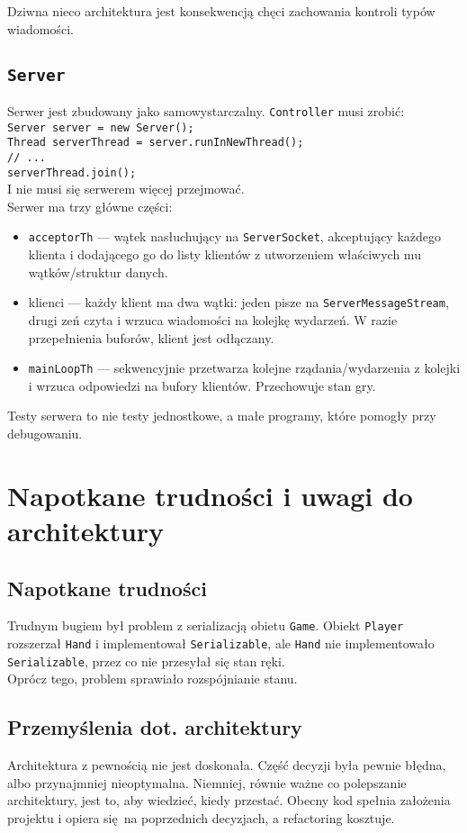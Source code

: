 \documentclass{article}
\newcommand{\ch}[1]{\texttt{#1}}
\begin{document}
Dziwna nieco architektura jest konsekwencją chęci zachowania kontroli typów wiadomości.

\subsection{\ch{Server}}

Serwer jest zbudowany jako samowystarczalny. \ch{Controller} musi zrobić:\\
\ch{Server server = new Server();\\
Thread serverThread = server.runInNewThread();\\
// ...\\
serverThread.join();}\\
I nie musi się serwerem więcej przejmować.\\

Serwer ma trzy główne części:
\begin{itemize}
	\item \ch{acceptorTh} --- wątek nasłuchujący na \ch{ServerSocket}, akceptujący każdego klienta i dodającego go do listy klientów z utworzeniem właściwych mu wątków/struktur danych.
	\item klienci --- każdy klient ma dwa wątki: jeden pisze na \ch{ServerMessageStream}, drugi zeń czyta i wrzuca wiadomości na kolejkę wydarzeń. W razie przepełnienia buforów, klient jest odłączany.
	\item \ch{mainLoopTh} --- sekwencyjnie przetwarza kolejne rządania/wydarzenia z kolejki i wrzuca odpowiedzi na bufory klientów. Przechowuje stan gry.
\end{itemize}

Testy serwera to nie testy jednostkowe, a małe programy, które pomogły przy debugowaniu.

\section{Napotkane trudności i uwagi do architektury}

\subsection{Napotkane trudności}

Trudnym bugiem był problem z serializacją obietu \ch{Game}. Obiekt \ch{Player} rozszerzał \ch{Hand} i implementował \ch{Serializable}, ale \ch{Hand} nie implementowało \ch{Serializable}, przez co nie przesyłał się stan ręki.\\

Oprócz tego, problem sprawiało rozspójnianie stanu.

\subsection{Przemyślenia dot. architektury}

Architektura z pewnością nie jest doskonała. Część decyzji była pewnie błędna, albo przynajmniej nieoptymalna. Niemniej, równie ważne co polepszanie architektury, jest to, aby wiedzieć, kiedy przestać. Obecny kod spełnia założenia projektu i opiera się na poprzednich decyzjach, a refactoring kosztuje.
\end{document}

